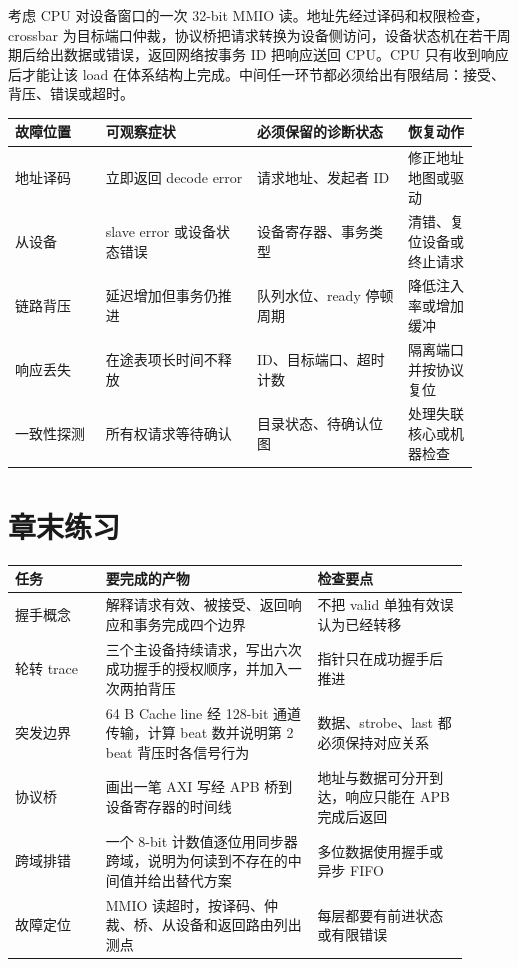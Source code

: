 考虑 CPU 对设备窗口的一次 32-bit MMIO 读。地址先经过译码和权限检查，crossbar 为目标端口仲裁，协议桥把请求转换为设备侧访问，设备状态机在若干周期后给出数据或错误，返回网络按事务 ID 把响应送回 CPU。CPU 只有收到响应后才能让该 load 在体系结构上完成。中间任一环节都必须给出有限结局：接受、背压、错误或超时。

\begin{longtable}{L{0.18\linewidth}L{0.30\linewidth}L{0.30\linewidth}L{0.14\linewidth}}
\toprule
故障位置 & 可观察症状 & 必须保留的诊断状态 & 恢复动作 \\
\midrule
地址译码 & 立即返回 decode error & 请求地址、发起者 ID & 修正地址地图或驱动 \\
从设备 & slave error 或设备状态错误 & 设备寄存器、事务类型 & 清错、复位设备或终止请求 \\
链路背压 & 延迟增加但事务仍推进 & 队列水位、ready 停顿周期 & 降低注入率或增加缓冲 \\
响应丢失 & 在途表项长时间不释放 & ID、目标端口、超时计数 & 隔离端口并按协议复位 \\
一致性探测 & 所有权请求等待确认 & 目录状态、待确认位图 & 处理失联核心或机器检查 \\
\bottomrule
\end{longtable}

\section*{章末练习}

\begin{longtable}{L{0.18\linewidth}L{0.42\linewidth}L{0.30\linewidth}}
\toprule
任务 & 要完成的产物 & 检查要点 \\
\midrule
握手概念 & 解释请求有效、被接受、返回响应和事务完成四个边界 & 不把 valid 单独有效误认为已经转移 \\
轮转 trace & 三个主设备持续请求，写出六次成功握手的授权顺序，并加入一次两拍背压 & 指针只在成功握手后推进 \\
突发边界 & 64 B Cache line 经 128-bit 通道传输，计算 beat 数并说明第 2 beat 背压时各信号行为 & 数据、strobe、last 都必须保持对应关系 \\
协议桥 & 画出一笔 AXI 写经 APB 桥到设备寄存器的时间线 & 地址与数据可分开到达，响应只能在 APB 完成后返回 \\
跨域排错 & 一个 8-bit 计数值逐位用同步器跨域，说明为何读到不存在的中间值并给出替代方案 & 多位数据使用握手或异步 FIFO \\
故障定位 & MMIO 读超时，按译码、仲裁、桥、从设备和返回路由列出测点 & 每层都要有前进状态或有限错误 \\
\bottomrule
\end{longtable}

